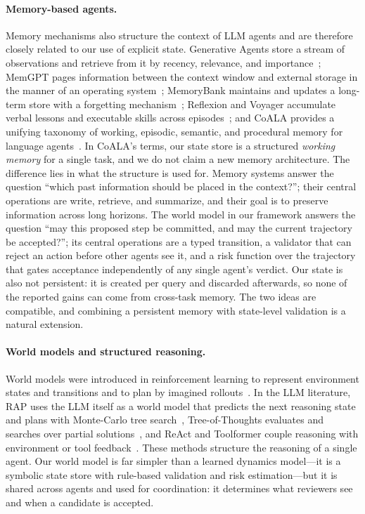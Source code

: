 \paragraph{Memory-based agents.}
Memory mechanisms also structure the context of LLM agents and are therefore closely related to our use of explicit state.
Generative Agents store a stream of observations and retrieve from it by recency, relevance, and importance~\cite{park2023generative}; MemGPT pages information between the context window and external storage in the manner of an operating system~\cite{packer2023memgpt}; MemoryBank maintains and updates a long-term store with a forgetting mechanism~\cite{zhong2024memorybank}; Reflexion and Voyager accumulate verbal lessons and executable skills across episodes~\cite{shinn2023reflexion,wang2024voyager}; and CoALA provides a unifying taxonomy of working, episodic, semantic, and procedural memory for language agents~\cite{sumers2024coala}.
In CoALA's terms, our state store is a structured \emph{working memory} for a single task, and we do not claim a new memory architecture.
The difference lies in what the structure is used for.
Memory systems answer the question ``which past information should be placed in the context?''; their central operations are write, retrieve, and summarize, and their goal is to preserve information across long horizons.
The world model in our framework answers the question ``may this proposed step be committed, and may the current trajectory be accepted?''; its central operations are a typed transition, a validator that can reject an action before other agents see it, and a risk function over the trajectory that gates acceptance independently of any single agent's verdict.
Our state is also not persistent: it is created per query and discarded afterwards, so none of the reported gains can come from cross-task memory.
The two ideas are compatible, and combining a persistent memory with state-level validation is a natural extension.

\paragraph{World models and structured reasoning.}
World models were introduced in reinforcement learning to represent environment states and transitions and to plan by imagined rollouts~\cite{ha2018recurrent,hafner2020dream}.
In the LLM literature, RAP uses the LLM itself as a world model that predicts the next reasoning state and plans with Monte-Carlo tree search~\cite{hao2023rap}, Tree-of-Thoughts evaluates and searches over partial solutions~\cite{yao2023tree}, and ReAct and Toolformer couple reasoning with environment or tool feedback~\cite{yao2023react,schick2023toolformer}.
These methods structure the reasoning of a single agent.
Our world model is far simpler than a learned dynamics model---it is a symbolic state store with rule-based validation and risk estimation---but it is shared across agents and used for coordination: it determines what reviewers see and when a candidate is accepted.

